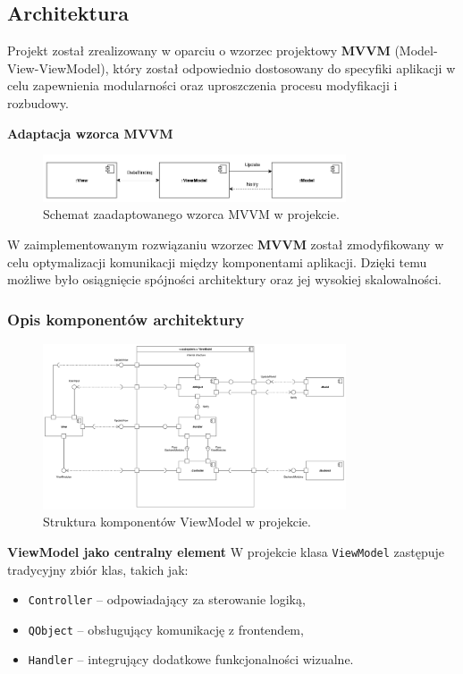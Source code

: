 \subsection{Architektura}
Projekt został zrealizowany w oparciu o wzorzec projektowy \textbf{MVVM} (Model-View-ViewModel), który został odpowiednio dostosowany do specyfiki aplikacji w celu zapewnienia modularności oraz uproszczenia procesu modyfikacji i rozbudowy.

\textbf{Adaptacja wzorca MVVM}
\begin{figure}[h!]
    \centering
    \includegraphics[width=0.8\textwidth]{img/diagramy/architektura.png}
    \caption{Schemat zaadaptowanego wzorca MVVM w projekcie.}
\end{figure}

W zaimplementowanym rozwiązaniu wzorzec \textbf{MVVM} został zmodyfikowany w celu optymalizacji komunikacji między komponentami aplikacji. Dzięki temu możliwe było osiągnięcie spójności architektury oraz jej wysokiej skalowalności.

\subsubsection{Opis komponentów architektury}
\begin{figure}[h!]
    \centering
    \includegraphics[width=0.8\textwidth]{img/diagramy/diagram_komp_vm.png}
    \caption{Struktura komponentów ViewModel w projekcie.}
\end{figure}

\textbf{ViewModel jako centralny element}
W projekcie klasa \texttt{ViewModel} zastępuje tradycyjny zbiór klas, takich jak:
\begin{itemize}
    \item \texttt{Controller} -- odpowiadający za sterowanie logiką,
    \item \texttt{QObject} -- obsługujący komunikację z frontendem,
    \item \texttt{Handler} -- integrujący dodatkowe funkcjonalności wizualne.
\end{itemize}

